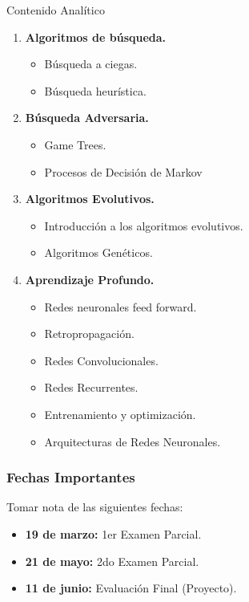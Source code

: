 \documentclass[10pt]{beamer}
\begin{document}
\begin{frame}{Contenido Analítico}
    \begin{enumerate}
        \item \textbf{Algoritmos de búsqueda.}
            \begin{itemize}
                \item Búsqueda a ciegas.
                \item Búsqueda heurística.
            \end{itemize}
        \item \textbf{Búsqueda Adversaria.}
            \begin{itemize}
                \item Game Trees.
                \item Procesos de Decisión de Markov
            \end{itemize}
        \item \textbf{Algoritmos Evolutivos.}
            \begin{itemize}
                \item Introducción a los algoritmos evolutivos.
                \item Algoritmos Genéticos.
            \end{itemize}
        \item \textbf{Aprendizaje Profundo.}
            \begin{itemize}
                \item Redes neuronales feed forward.
                \item Retropropagación.
                \item Redes Convolucionales.
                \item Redes Recurrentes.
                \item Entrenamiento y optimización.
                \item Arquitecturas de Redes Neuronales.
            \end{itemize}
    \end{enumerate}
\end{frame}

\begin{frame}
    \frametitle{Fechas Importantes}
    Tomar nota de las siguientes fechas:
    \begin{itemize}
        \item \alert{\textbf{19 de marzo:}} 1er Examen Parcial.
        \item \alert{\textbf{21 de mayo:}} 2do Examen Parcial.
        \item \alert{\textbf{11 de junio:}} Evaluación Final (Proyecto).
    \end{itemize}
    

\end{frame}
\end{document}
